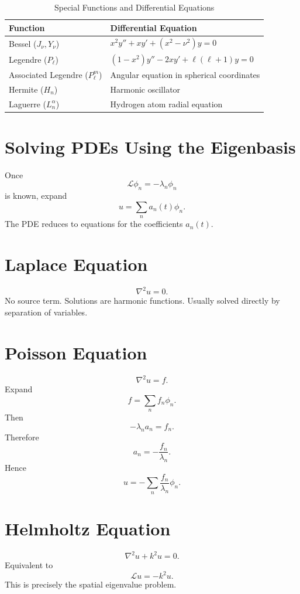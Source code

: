 \documentclass[aps,prl,twocolumn,groupedaddress]{revtex4-2}
\begin{document}
\begin{table}[h]
\centering
\caption{Special Functions and Differential Equations}
\label{tab:special_functions}
\begin{tabular}{ll}
\toprule
\textbf{Function} & \textbf{Differential Equation} \\
\midrule
Bessel ($J_\nu, Y_\nu$) & $x^2y''+xy'+(x^2-\nu^2)y=0$ \\ \addlinespace
Legendre ($P_\ell$) & $(1-x^2)y''-2xy'+\ell(\ell+1)y=0$ \\ \addlinespace
Associated Legendre ($P_\ell^m$) & Angular equation in spherical coordinates \\ \addlinespace
Hermite ($H_n$) & Harmonic oscillator \\ \addlinespace
Laguerre ($L_n^\alpha$) & Hydrogen atom radial equation \\
\bottomrule
\end{tabular}
\end{table}

\section{Solving PDEs Using the Eigenbasis}

Once
$$
\mathcal L\phi_n=-\lambda_n\phi_n
$$
is known, expand
$$
u
=
\sum_n a_n(t)\phi_n.
$$
The PDE reduces to equations for the coefficients $a_n(t)$.

\section{Laplace Equation}

$$
\nabla^2u=0.
$$
No source term.
Solutions are harmonic functions.
Usually solved directly by separation of variables.

\section{Poisson Equation}

$$
\nabla^2u=f.
$$
Expand
$$
f
=
\sum_n f_n\phi_n.
$$
Then
$$
-\lambda_n a_n=f_n.
$$
Therefore
$$
a_n
=
-\frac{f_n}{\lambda_n}.
$$
Hence
$$
u
=
-\sum_n
\frac{f_n}{\lambda_n}
\phi_n.
$$

\section{Helmholtz Equation}

$$
\nabla^2u+k^2u=0.
$$
Equivalent to
$$
\mathcal L u=-k^2u.
$$
This is precisely the spatial eigenvalue problem.
\end{document}
